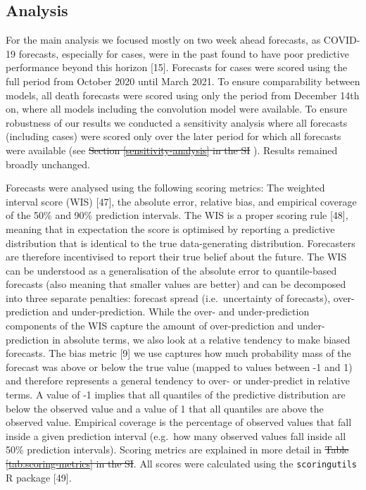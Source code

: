 \documentclass[10pt,letterpaper]{article}
\providecommand{\DIFaddtex}[1]{{\protect\color{blue}\uwave{#1}}} %
\providecommand{\DIFdeltex}[1]{{\protect\color{red}\sout{#1}}}                      %
\providecommand{\DIFaddbegin}{} %
\providecommand{\DIFaddend}{} %
\providecommand{\DIFdelbegin}{} %
\providecommand{\DIFdelend}{} %
\providecommand{\DIFadd}[1]{\texorpdfstring{\DIFaddtex{#1}}{#1}} %
\providecommand{\DIFdel}[1]{\texorpdfstring{\DIFdeltex{#1}}{}} %
\newcommand{\DIFscaledelfig}{0.5}
\newlength{\DIFdelgraphicswidth} %
\newlength{\DIFdelgraphicsheight} %
\newcommand{\DIFaddincludegraphics}[2][]{{\color{blue}\fbox{\DIFOincludegraphics[#1]{#2}}}} %
\newcommand{\DIFdelincludegraphics}[2][]{%
\sbox{\DIFdelgraphicsbox}{\DIFOincludegraphics[#1]{#2}}%
\settoboxwidth{\DIFdelgraphicswidth}{\DIFdelgraphicsbox} %
\settoboxtotalheight{\DIFdelgraphicsheight}{\DIFdelgraphicsbox} %
\scalebox{\DIFscaledelfig}{%
\parbox[b]{\DIFdelgraphicswidth}{\usebox{\DIFdelgraphicsbox}\\[-\baselineskip] \rule{\DIFdelgraphicswidth}{0em}}\llap{\resizebox{\DIFdelgraphicswidth}{\DIFdelgraphicsheight}{%
\setlength{\unitlength}{\DIFdelgraphicswidth}%
\begin{picture}(1,1)%
\thicklines\linethickness{2pt} %
{\color[rgb]{1,0,0}\put(0,0){\framebox(1,1){}}}%
{\color[rgb]{1,0,0}\put(0,0){\line( 1,1){1}}}%
{\color[rgb]{1,0,0}\put(0,1){\line(1,-1){1}}}%
\end{picture}%
}\hspace*{3pt}}} %
} %
\DeclareRobustCommand{\DIFaddbegin}{\DIFOaddbegin \let\includegraphics\DIFaddincludegraphics} %
\DeclareRobustCommand{\DIFaddend}{\DIFOaddend \let\includegraphics\DIFOincludegraphics} %
\DeclareRobustCommand{\DIFdelbegin}{\DIFOdelbegin \let\includegraphics\DIFdelincludegraphics} %
\DeclareRobustCommand{\DIFdelend}{\DIFOaddend \let\includegraphics\DIFOincludegraphics} %
\begin{document}
\hypertarget{analysis}{%
\subsection{Analysis}\label{analysis}}

For the main analysis we focused mostly on two week ahead forecasts, as
COVID-19 forecasts, especially for cases, were in the past found to have
poor predictive performance beyond this horizon {[}15{]}. Forecasts for
cases were scored using the full period from October 2020 until March
2021. To ensure comparability between models, all death forecasts were
scored using only the period from December 14th on, where all models
including the convolution model were available. To ensure robustness of
our results we conducted a sensitivity analysis where all forecasts
(including cases) were scored only over the later period for which all
forecasts were available (see \DIFdelbegin \DIFdel{Section \ref{sensitivity-analysis} in the
SI}\DIFdelend \DIFaddbegin {} \DIFadd{and
} \DIFadd{and }\DIFadd{s}\DIFaddend ).
Results remained broadly unchanged.

Forecasts were analysed using the following scoring metrics: The
weighted interval score (WIS) {[}47{]}, the absolute error, relative
bias, and empirical coverage of the 50\% and 90\% prediction intervals.
The WIS is a proper scoring rule {[}48{]}, meaning that in expectation
the score is optimised by reporting a predictive distribution that is
identical to the true data-generating distribution. Forecasters are
therefore incentivised to report their true belief about the future. The
WIS can be understood as a generalisation of the absolute error to
quantile-based forecasts (also meaning that smaller values are better)
and can be decomposed into three separate penalties: forecast spread
(i.e.~uncertainty of forecasts), over-prediction and under-prediction.
While the over- and under-prediction components of the WIS capture the
amount of over-prediction and under-prediction in absolute terms, we
also look at a relative tendency to make biased forecasts. The bias
metric {[}9{]} we use captures how much probability mass of the forecast
was above or below the true value (mapped to values between -1 and 1)
and therefore represents a general tendency to over- or under-predict in
relative terms. A value of -1 implies that all quantiles of the
predictive distribution are below the observed value and a value of 1
that all quantiles are above the observed value. Empirical coverage is
the percentage of observed values that fall inside a given prediction
interval (e.g.~how many observed values fall inside all 50\% prediction
intervals). Scoring metrics are explained in more detail in
\DIFdelbegin \DIFdel{Table
\ref{tab:scoring-metrics} in the SI}\DIFdelend \DIFaddbegin {}\DIFaddend . All scores were calculated using the
\texttt{scoringutils} R package {[}49{]}.
\end{document}
